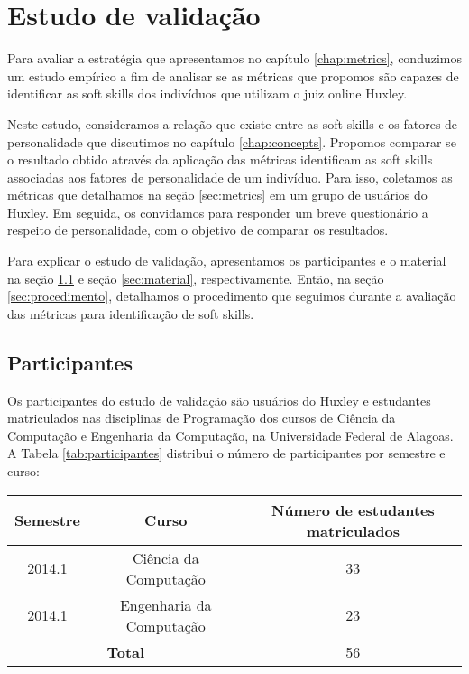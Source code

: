 

\chapter{Estudo de validação}

\label{chap:evaluation}

Para avaliar a estratégia que apresentamos no capítulo \ref{chap:metrics}, conduzimos um estudo empírico a fim de analisar se as métricas que propomos são capazes de identificar as soft skills dos indivíduos que utilizam o juiz online Huxley.

Neste estudo, consideramos a relação que existe entre as soft skills e os fatores de personalidade que discutimos no capítulo \ref{chap:concepts}. Propomos comparar se o resultado obtido através da aplicação das métricas identificam as soft skills associadas aos fatores de personalidade de um indivíduo. Para isso, coletamos as métricas que detalhamos na seção \ref{sec:metrics} em um grupo de usuários do Huxley. Em seguida, os convidamos para responder um breve questionário a respeito de personalidade, com o objetivo de comparar os resultados. 

Para explicar o estudo de validação, apresentamos os participantes e o material na seção \ref{sec:participantes} e seção \ref{sec:material}, respectivamente. Então, na seção \ref{sec:procedimento}, detalhamos o procedimento que seguimos durante a avaliação das métricas para identificação de soft skills.

\section{Participantes}
\label{sec:participantes}

Os participantes do estudo de validação são usuários do Huxley e estudantes matriculados nas disciplinas de Programação dos cursos de Ciência da Computação e Engenharia da Computação, na Universidade Federal de Alagoas. A Tabela \ref{tab:participantes} distribui o número de participantes por semestre e curso:

\begin{table*}[h]
\footnotesize
\caption{\small Participantes}
\addtolength{\tabcolsep}{-3.5pt}
\renewcommand{\arraystretch}{1.7} 
\centering

\begin{tabular}{|c|c|c|}
\hline
\textbf{Semestre} & \textbf{Curso} 		& 	\textbf{Número de estudantes matriculados} \\ \hline
2014.1 & Ciência da Computação 		 		& 	33 		\\ \hline
2014.1 & Engenharia da Computação 		& 	23 		\\ \hline
\multicolumn{2}{|c|}{\textbf{Total}} 	&		56 		\\ \hline
\end{tabular}

\label{tab:participantes}
\end{table*}

